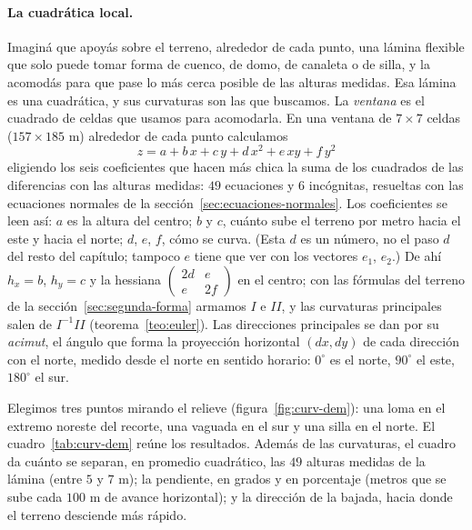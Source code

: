 \paragraph{La cuadrática local.} Imaginá que apoyás sobre el terreno, alrededor de cada punto,
una lámina flexible que solo puede tomar forma de cuenco, de domo, de canaleta o de silla, y la
acomodás para que pase lo más cerca posible de las alturas medidas. Esa lámina es una
cuadrática, y sus curvaturas son las que buscamos. La \emph{ventana} es el cuadrado de celdas
que usamos para acomodarla. En una ventana de \(7\times7\) celdas
(\(157\times185\) m) alrededor de cada punto calculamos
\[
  z=a+b\,x+c\,y+d\,x^2+e\,xy+f\,y^2
\]
eligiendo los seis coeficientes que hacen más chica la suma de los cuadrados de las diferencias
con las alturas medidas: \(49\) ecuaciones y \(6\) incógnitas, resueltas con las ecuaciones
normales de la sección~\ref{sec:ecuaciones-normales}. Los coeficientes se leen así: \(a\) es la
altura del centro; \(b\) y \(c\), cuánto sube el terreno por metro hacia el este y hacia el
norte; \(d\), \(e\), \(f\), cómo se curva. (Esta \(d\) es un número, no el paso \(d\) del resto
del capítulo; tampoco \(e\) tiene que ver con los vectores \(e_1\), \(e_2\).) De ahí \(h_x=b\), \(h_y=c\) y la
hessiana \(\left(\begin{smallmatrix}2d&e\\e&2f\end{smallmatrix}\right)\) en el centro; con las
fórmulas del terreno de la sección~\ref{sec:segunda-forma} armamos \(I\) e \(II\), y las
curvaturas principales salen de \(I^{-1}II\) (teorema~\ref{teo:euler}). Las direcciones
principales se dan por su \emph{acimut}, el ángulo que forma la proyección horizontal
\((dx,dy)\) de cada dirección con el norte, medido desde el
norte en sentido horario: \(0^\circ\) es el norte, \(90^\circ\) el este, \(180^\circ\) el sur.

Elegimos tres puntos mirando el relieve (figura~\ref{fig:curv-dem}): una loma en el
extremo noreste del recorte, una vaguada en el sur y una silla en el norte. El
cuadro~\ref{tab:curv-dem} reúne los resultados. Además de las curvaturas, el cuadro da cuánto se
separan, en promedio cuadrático, las \(49\) alturas medidas de la lámina (entre \(5\) y \(7\) m);
la pendiente, en grados y en porcentaje (metros que se sube cada \(100\) m de avance
horizontal); y la dirección de la bajada, hacia donde el terreno desciende más rápido.

